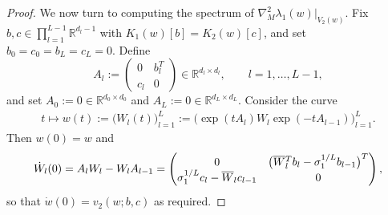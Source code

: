 \documentclass{article}
\newcommand{\RB}{\mathbb{R}}
\newcommand{\bW}{\smash{\overline{W}}\vphantom{W}}
\theoremstyle{plain}
\theoremstyle{definition}
\theoremstyle{remark}
\begin{document}
\begin{proof}
    We now turn to computing the spectrum of $\nabla^2_M\lambda_1(w)|_{V_2(w)}$. Fix $b,c\in\prod_{l=1}^{L-1}\RB^{d_l-1}$ with $K_1(w)[b]=K_2(w)[c]$, and set
    $b_0=c_0=b_L=c_L=0$. Define
    \[
    A_l:=\begin{pmatrix}0&b_l^T\\ c_l&0\end{pmatrix}\in\RB^{d_l\times d_l},
    \qquad l=1,\dots,L-1,
    \]
    and set $A_0:=0\in\RB^{d_0\times d_0}$ and $A_L:=0\in\RB^{d_L\times d_L}$.
    Consider the curve
    \begin{align}
    t\mapsto w(t):=\big(W_l(t)\big)_{l=1}^L
    :=\big(\exp(tA_l)W_l\exp(-tA_{l-1})\big)_{l=1}^L.
    \end{align}
    Then $w(0)=w$ and
    \begin{align}
    \dot W_l(0)=A_lW_l-W_lA_{l-1}
    =
    \begin{pmatrix}
    0 & \big(\bW_l^Tb_l-\sigma_1^{1/L}b_{l-1}\big)^T \\
    \sigma_1^{1/L}c_l-\bW_lc_{l-1} & 0
    \end{pmatrix},
    \end{align}
    so that $\dot w(0)=v_2(w;b,c)$ as required.
    

\end{proof}
\end{document}
